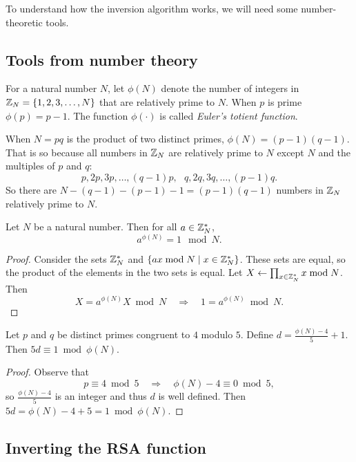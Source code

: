 To understand how the inversion algorithm works, we will need some
number-theoretic tools.


\subsection{Tools from number theory}
For a natural number $N$, let $\phi(N)$ denote the number of integers
in $\mathbb{Z}_N = \{1, 2, 3, \dots, N\}$ that are relatively prime to $N$.
When $p$ is prime $\phi(p) = p-1$.
The function $\phi(\cdot)$ is called \emph{Euler's totient function}.

When $N=pq$ is the product of two distinct primes, $\phi(N) = (p-1)(q-1)$.
That is so because all numbers in $\mathbb{Z}_N$ are relatively prime to $N$ except
$N$ and the multiples of $p$ and $q$:
\[ p, 2p, 3p, \dots, (q-1)p,\ \ \ q, 2q, 3q, \dots, (p-1)q.\]
So there are $N - (q-1) - (p-1) - 1 = (p-1)(q-1)$ numbers
in $\mathbb{Z}_N$ relatively prime to $N$.

\begin{theorem}\label{thm:euler}
Let $N$ be a natural number. Then for all $a \in \mathbb{Z}^*_N$,
\[ a^{\phi(N)} = 1 \mod N.\]
\end{theorem}
\begin{proof}
Consider the sets $\mathbb{Z}^*_N$ and $\{ax \bmod N \mid x \in \mathbb{Z}^*_N\}$.
These sets are equal, so the product of the elements in the two
sets is equal.
Let $X \gets \prod_{x \in \mathbb{Z}^*_N} x \bmod N$.
Then 
\[ X = a^{\phi(N)}X \bmod N \quad \Rightarrow\quad 1 = a^{\phi(N)} \bmod N.\]
\end{proof}

\begin{lemma}\label{lemma:inv}
Let $p$ and $q$ be distinct primes congruent to $4$ modulo $5$.
Define $d = \frac{\phi(N) - 4}{5} + 1$.
Then $5d \equiv 1 \bmod \phi(N)$.
\end{lemma}

\begin{proof}
Observe that
\[ p \equiv 4 \bmod 5 \quad \Rightarrow \quad \phi(N) - 4 \equiv 0 \bmod 5,\]
so $\frac{\phi(N) - 4}{5}$ is an integer and thus $d$ is well defined.
Then $5 d = \phi(N) - 4 + 5 = 1 \bmod \phi(N)$.
\end{proof}


\subsection{Inverting the RSA function}

